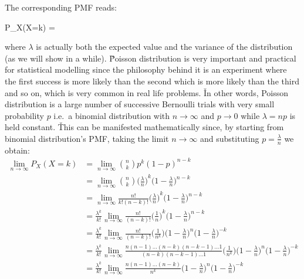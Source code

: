 The corresponding PMF reads:

\bse
P_{X}(X=k) = 
\ese
\ed

where $\lambda$ is actually both the expected value and the variance of the distribution (as we will show in a while). \v

Poisson distribution is very important and practical for statistical modelling since the philosophy behind it is an
experiment where the first success is more likely than the second which is more likely than the third and so on,
which is very common in real life problems. \v

In other words, Poisson distribution is a large number of successive Bernoulli trials with very small probability $p$
i.e.\ a binomial distribution with $n \to \infty$ and $p \to 0$ while $\lambda = n p$ is held constant. \v

This can be manifested mathematically since, by starting from binomial distribution's PMF, taking the limit $n \to
\infty$ and substituting $p = \frac{\lambda}{n}$ we obtain:
\begingroup
\allowdisplaybreaks
{\setlength{\jot}{10pt}
\begin{align*}
\lim_{n\to\infty} P_{X}(X=k) &= \lim_{n\to\infty} \binom{n}{k}p^{k} (1-p)^{n-k} \\
&= \lim_{n\to\infty} \binom{n}{k}{\Big( \frac{\lambda}{n} \Big)}^{k} \Big(1-\frac{\lambda}{n} \Big)^{n-k} \\
&= \lim_{n\to\infty} \frac{n!}{k!(n-k)!}{ \Big( \frac{\lambda}{n} \Big)}^{k} \Big( 1-\frac{\lambda}{n} \Big)^{n-k} \\
&= \frac{\lambda^k}{k!} \lim_{n\to\infty} \frac{n!}{(n-k)!}{ \Big(\frac{1}{n} \Big)}^{k}
\Big(1-\frac{\lambda}{n} \Big)^{n-k} \\
&= \frac{\lambda^k}{k!} \lim_{n\to\infty} \frac{n!}{(n-k)!}{\Big(\frac{1}{n^{k}} \Big)}
\Big(1-\frac{\lambda}{n} \Big)^{n} \Big( 1-\frac{\lambda}{n} \Big)^{-k} \\
&= \frac{\lambda^k}{k!} \lim_{n\to\infty} \frac{n (n-1) \ldots (n-k)(n-k-1) \ldots 1}{(n-k) (n-k-1) \ldots 1}
{\Big( \frac{1}{n^{k}} \Big)} \Big( 1-\frac{\lambda}{n} \Big)^{n} \Big( 1-\frac{\lambda}{n} \Big)^{-k} \\
&= \frac{\lambda^k}{k!} \lim_{n\to\infty} \frac{n (n-1) \ldots (n-k)}{n^{k}} \Big( 1-\frac{\lambda}{n} \Big)^{n}
\Big(1-\frac{\lambda}{n} \Big)^{-k}
\end{align*}}
\endgroup

